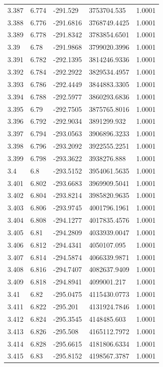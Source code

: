 \begin{tabular}{lllll}
3.387 & 6.774 & -291.529 & 3753704.535 & 1.0001 \\
3.388 & 6.776 & -291.6816 & 3768749.4425 & 1.0001 \\
3.389 & 6.778 & -291.8342 & 3783854.6501 & 1.0001 \\
3.39 & 6.78 & -291.9868 & 3799020.3996 & 1.0001 \\
3.391 & 6.782 & -292.1395 & 3814246.9336 & 1.0001 \\
3.392 & 6.784 & -292.2922 & 3829534.4957 & 1.0001 \\
3.393 & 6.786 & -292.4449 & 3844883.3305 & 1.0001 \\
3.394 & 6.788 & -292.5977 & 3860293.6836 & 1.0001 \\
3.395 & 6.79 & -292.7505 & 3875765.8016 & 1.0001 \\
3.396 & 6.792 & -292.9034 & 3891299.932 & 1.0001 \\
3.397 & 6.794 & -293.0563 & 3906896.3233 & 1.0001 \\
3.398 & 6.796 & -293.2092 & 3922555.2251 & 1.0001 \\
3.399 & 6.798 & -293.3622 & 3938276.888 & 1.0001 \\
3.4 & 6.8 & -293.5152 & 3954061.5635 & 1.0001 \\
3.401 & 6.802 & -293.6683 & 3969909.5041 & 1.0001 \\
3.402 & 6.804 & -293.8214 & 3985820.9635 & 1.0001 \\
3.403 & 6.806 & -293.9745 & 4001796.1961 & 1.0001 \\
3.404 & 6.808 & -294.1277 & 4017835.4576 & 1.0001 \\
3.405 & 6.81 & -294.2809 & 4033939.0047 & 1.0001 \\
3.406 & 6.812 & -294.4341 & 4050107.095 & 1.0001 \\
3.407 & 6.814 & -294.5874 & 4066339.9871 & 1.0001 \\
3.408 & 6.816 & -294.7407 & 4082637.9409 & 1.0001 \\
3.409 & 6.818 & -294.8941 & 4099001.217 & 1.0001 \\
3.41 & 6.82 & -295.0475 & 4115430.0773 & 1.0001 \\
3.411 & 6.822 & -295.201 & 4131924.7846 & 1.0001 \\
3.412 & 6.824 & -295.3545 & 4148485.603 & 1.0001 \\
3.413 & 6.826 & -295.508 & 4165112.7972 & 1.0001 \\
3.414 & 6.828 & -295.6615 & 4181806.6334 & 1.0001 \\
3.415 & 6.83 & -295.8152 & 4198567.3787 & 1.0001 \\

\end{tabular}
